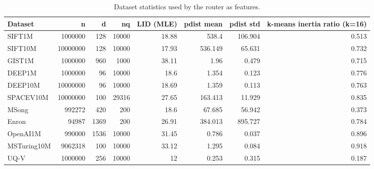 \begin{table}[t]
\centering
\small
\caption{Dataset statistics used by the router as features.}
\label{tab:dataset-features}
\begin{tabular}{lrrrrrrr}
\toprule
Dataset & n & d & nq & LID (MLE) & pdist mean & pdist std & k-means inertia ratio (k=16) \\
\midrule
SIFT1M & 1000000 & 128 & 10000 & 18.88 & 538.4 & 106.904 & 0.513 \\
SIFT10M & 10000000 & 128 & 10000 & 17.93 & 536.149 & 65.631 & 0.732 \\
GIST1M & 1000000 & 960 & 1000 & 38.11 & 1.96 & 0.479 & 0.715 \\
DEEP1M & 1000000 & 96 & 10000 & 18.6 & 1.354 & 0.123 & 0.776 \\
DEEP10M & 10000000 & 96 & 10000 & 18.69 & 1.359 & 0.113 & 0.763 \\
SPACEV10M & 10000000 & 100 & 29316 & 27.65 & 163.413 & 11.929 & 0.835 \\
MSong & 992272 & 420 & 200 & 18.6 & 67.685 & 56.942 & 0.373 \\
Enron & 94987 & 1369 & 200 & 26.91 & 384.013 & 895.727 & 0.784 \\
OpenAI1M & 990000 & 1536 & 10000 & 31.45 & 0.786 & 0.037 & 0.896 \\
MSTuring10M & 9062318 & 100 & 10000 & 33.12 & 1.295 & 0.084 & 0.918 \\
UQ-V & 1000000 & 256 & 10000 & 12 & 0.253 & 0.315 & 0.187 \\
\bottomrule
\end{tabular}
\end{table}
